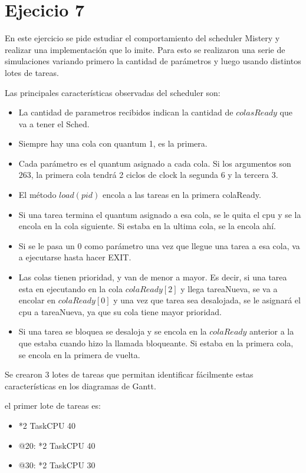 \section{Ejecicio 7}

En este ejercicio se pide estudiar el comportamiento del scheduler Mistery y realizar una implementación que lo imite.
Para esto se realizaron una serie de simulaciones variando primero la cantidad de parámetros y luego usando distintos lotes de tareas.

Las principales características observadas del scheduler son:
\begin{itemize}
\item La cantidad de parametros recibidos indican la cantidad de $colasReady$ que va a tener el Sched.
\item Siempre hay una cola con quantum 1, es la primera.
\item Cada parámetro es el quantum asignado a cada cola. Si los argumentos son $2 6 3$, la primera cola tendrá 2 ciclos de clock
la segunda 6 y la tercera 3.
\item El método $load(pid)$ encola a las tareas en la primera colaReady. 
\item Si una tarea termina el quantum asignado a esa cola, se le quita el cpu y se la encola en la cola siguiente. Si estaba en la ultima cola, se la encola ahí.
\item Si se le pasa un 0 como parámetro una vez que llegue una tarea a esa cola, va a ejecutarse hasta hacer EXIT.
\item Las colas tienen prioridad, y van de menor a mayor. Es decir, si una tarea esta en ejecutando en la cola $colaReady[2]$ y llega tareaNueva, se va a encolar
en $colaReady[0]$ y una vez que tarea sea desalojada, se le asignará el cpu a tareaNueva, ya que su cola tiene mayor prioridad.
\item Si una tarea se bloquea se desaloja y se encola en la $colaReady$ anterior a la que estaba cuando hizo la llamada bloqueante. Si estaba en la primera cola,
se encola en la primera de vuelta.
\end{itemize}


Se crearon 3 lotes de tareas que permitan identificar fácilmente estas características en los diagramas de Gantt.

el primer lote de tareas es:

\begin{itemize}

\item *2 TaskCPU 40
\item @20:
 *2 TaskCPU 40
\item @30:
*2 TaskCPU 30

\end{itemize}

